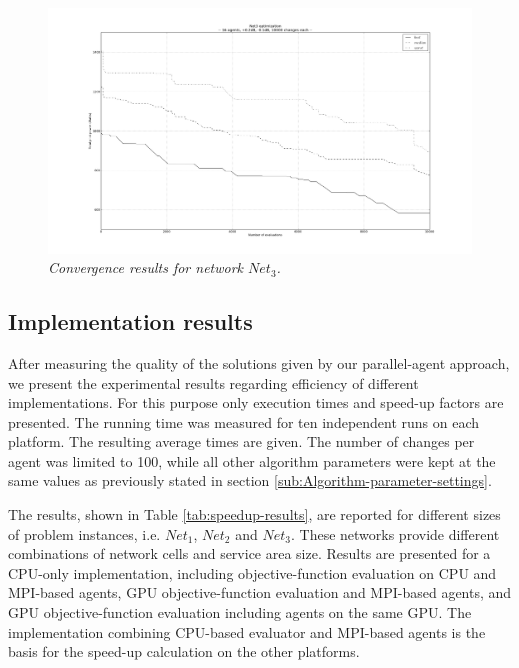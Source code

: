 \begin{figure}
\centering

\includegraphics[width=1\textwidth]{07-experimental_evaluation/img/convergence_3}

\caption{\textit{Convergence results for network $Net_{3}$.\label{fig:convergence_net3}}}
\end{figure}



\subsection{Implementation results}

After measuring the quality of the solutions given by our parallel-agent
approach, we present the experimental results regarding efficiency
of different implementations. For this purpose only execution times
and speed-up factors are presented. The running time was measured
for ten independent runs on each platform. The resulting average times
are given. The number of changes per agent was limited to 100, while
all other algorithm parameters were kept at the same values as previously
stated in section \ref{sub:Algorithm-parameter-settings}.

The results, shown in Table \ref{tab:speedup-results}, are reported
for different sizes of problem instances, i.e. $Net_{1}$, $Net_{2}$
and $Net_{3}$. These networks provide different combinations of network
cells and service area size. Results are presented for a CPU-only
implementation, including objective-function evaluation on CPU and
MPI-based agents, GPU objective-function evaluation and MPI-based
agents, and GPU objective-function evaluation including agents on
the same GPU. The implementation combining CPU-based evaluator and
MPI-based agents is the basis for the speed-up calculation on the
other platforms.

